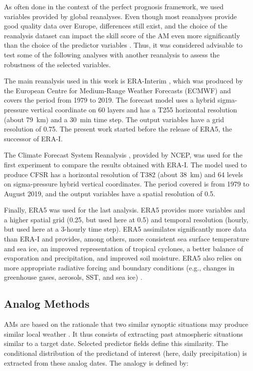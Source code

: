 \documentclass[draft]{agujournal2019}
\begin{document}
As often done in the context of the perfect prognosis framework, we used variables provided by global reanalyses. Even though most reanalyses provide good quality data over Europe, differences still exist, and the choice of the reanalysis dataset can impact the skill score of the AM even more significantly than the choice of the predictor variables \cite{Horton2018b}. Thus, it was considered advisable to test some of the following analyses with another reanalysis to assess the robustness of the selected variables.

The main reanalysis used in this work is ERA-Interim \cite<ERA-I,>{Dee2011a}, which was produced by the European Centre for Medium-Range Weather Forecasts (ECMWF) and covers the period from 1979 to 2019. The forecast model uses a hybrid sigma-pressure vertical coordinate on 60 layers and has a T255 horizontal resolution (about 79~km) and a 30~min time step. The output variables have a grid resolution of 0.75\degree. The present work started before the release of ERA5, the successor of ERA-I.

The Climate Forecast System Reanalysis \cite<CFSR,>{Saha2010a}, provided by NCEP, was used for the first experiment to compare the results obtained with ERA-I. The model used to produce CFSR has a horizontal resolution of T382 (about 38~km) and 64 levels on sigma-pressure hybrid vertical coordinates. The period covered is from 1979 to August 2019, and the output variables have a spatial resolution of 0.5\degree.

Finally, ERA5 \cite{Hersbach2019} was used for the last analysis. ERA5 provides more variables and a higher spatial grid (0.25\degree, but used here at 0.5\degree) and temporal resolution (hourly, but used here at a 3-hourly time step). ERA5 assimilates significantly more data than ERA-I and provides, among others, more consistent sea surface temperature and sea ice, an improved representation of tropical cyclones, a better balance of evaporation and precipitation, and improved soil moisture. ERA5 also relies on more appropriate radiative forcing and boundary conditions (e.g., changes in greenhouse gases, aerosols, SST, and sea ice) \cite{Hersbach2019}.


\subsection{Analog Methods}
\label{ams}

AMs are based on the rationale that two similar synoptic situations may produce similar local weather \cite{Lorenz1956, Lorenz1969}. It thus consists of extracting past atmospheric situations similar to a target date. Selected predictor fields define this similarity. The conditional distribution of the predictand of interest (here, daily precipitation) is extracted from these analog dates. The analogy is defined by:
\end{document}
